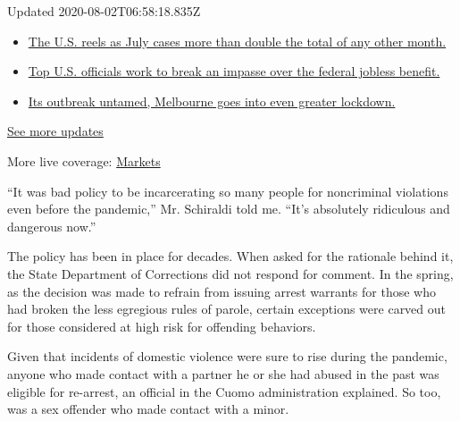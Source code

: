 Updated 2020-08-02T06:58:18.835Z

\begin{itemize}
\tightlist
\item
  \href{https://www.nytimes.com/2020/08/01/world/coronavirus-covid-19.html?action=click\&pgtype=Article\&state=default\&region=MAIN_CONTENT_1\&context=storylines_live_updates\#link-34047410}{The
  U.S. reels as July cases more than double the total of any other
  month.}
\item
  \href{https://www.nytimes.com/2020/08/01/world/coronavirus-covid-19.html?action=click\&pgtype=Article\&state=default\&region=MAIN_CONTENT_1\&context=storylines_live_updates\#link-780ec966}{Top
  U.S. officials work to break an impasse over the federal jobless
  benefit.}
\item
  \href{https://www.nytimes.com/2020/08/01/world/coronavirus-covid-19.html?action=click\&pgtype=Article\&state=default\&region=MAIN_CONTENT_1\&context=storylines_live_updates\#link-2bc8948}{Its
  outbreak untamed, Melbourne goes into even greater lockdown.}
\end{itemize}

\href{https://www.nytimes.com/2020/08/01/world/coronavirus-covid-19.html?action=click\&pgtype=Article\&state=default\&region=MAIN_CONTENT_1\&context=storylines_live_updates}{See
more updates}

More live coverage:
\href{https://www.nytimes.com/live/2020/07/31/business/stock-market-today-coronavirus?action=click\&pgtype=Article\&state=default\&region=MAIN_CONTENT_1\&context=storylines_live_updates}{Markets}

``It was bad policy to be incarcerating so many people for noncriminal
violations even before the pandemic,'' Mr. Schiraldi told me. ``It's
absolutely ridiculous and dangerous now.''

The policy has been in place for decades. When asked for the rationale
behind it, the State Department of Corrections did not respond for
comment. In the spring, as the decision was made to refrain from issuing
arrest warrants for those who had broken the less egregious rules of
parole, certain exceptions were carved out for those considered at high
risk for offending behaviors.

Given that incidents of domestic violence were sure to rise during the
pandemic, anyone who made contact with a partner he or she had abused in
the past was eligible for re-arrest, an official in the Cuomo
administration explained. So too, was a sex offender who made contact
with a minor.

